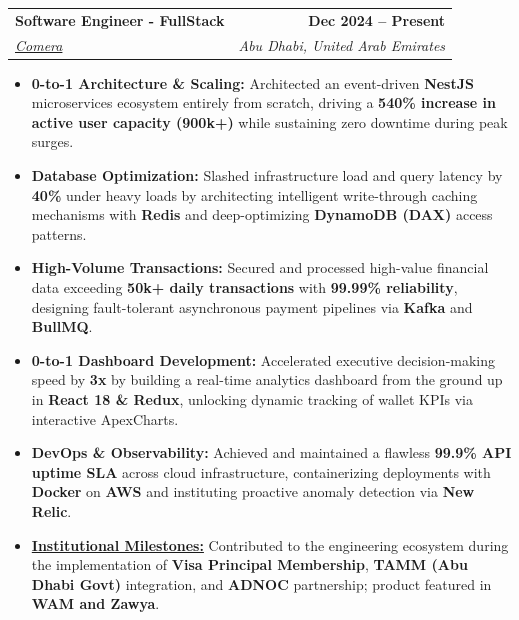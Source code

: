 \documentclass[letterpaper,12pt]{article}
\makeatletter
\newcommand{\resumeItem}[1]{
  \item\small{
    {#1}
  }
}
\newcommand{\resumeSubheading}[4]{
  \vspace{4pt}\item
    \begin{tabular*}{1.0\textwidth}[t]{l@{\extracolsep{\fill}}r}
      \textbf{#1} & \textbf{\small #2} \\
      \textit{\small#3} & \textit{\small #4} \\
    \end{tabular*}\vspace{2pt}
}
\newcommand{\resumeItemListStart}{\begin{itemize}}
\newcommand{\resumeItemListEnd}{\end{itemize}\vspace{-2pt}}
\makeatother
\begin{document}
    \resumeSubheading
      {Software Engineer - FullStack}{Dec 2024 -- Present}
      {\href{https://mycomera.com/}{Comera}}{Abu Dhabi, United Arab Emirates}
      \resumeItemListStart
        \resumeItem{\textbf{0-to-1 Architecture \& Scaling:} Architected an event-driven \textbf{NestJS} microservices ecosystem entirely from scratch, driving a \textbf{540\% increase in active user capacity (900k+)} while sustaining zero downtime during peak surges.}
        \resumeItem{\textbf{Database Optimization:} Slashed infrastructure load and query latency by \textbf{40\%} under heavy loads by architecting intelligent write-through caching mechanisms with \textbf{Redis} and deep-optimizing \textbf{DynamoDB (DAX)} access patterns.}
        \resumeItem{\textbf{High-Volume Transactions:} Secured and processed high-value financial data exceeding \textbf{50k+ daily transactions} with \textbf{99.99\% reliability}, designing fault-tolerant asynchronous payment pipelines via \textbf{Kafka} and \textbf{BullMQ}.}
        \resumeItem{\textbf{0-to-1 Dashboard Development:} Accelerated executive decision-making speed by \textbf{3x} by building a real-time analytics dashboard from the ground up in \textbf{React 18 \& Redux}, unlocking dynamic tracking of wallet KPIs via interactive ApexCharts.}
        \resumeItem{\textbf{DevOps \& Observability:} Achieved and maintained a flawless \textbf{99.9\% API uptime SLA} across cloud infrastructure, containerizing deployments with \textbf{Docker} on \textbf{AWS} and instituting proactive anomaly detection via \textbf{New Relic}.}
        \resumeItem{\textbf{\href{https://jaseem8.github.io/\#comera}{Institutional Milestones:}} Contributed to the engineering ecosystem during the implementation of \textbf{Visa Principal Membership}, \textbf{TAMM (Abu Dhabi Govt)} integration, and \textbf{ADNOC} partnership; product featured in \textbf{WAM and Zawya}.}
      \resumeItemListEnd
\end{document}
